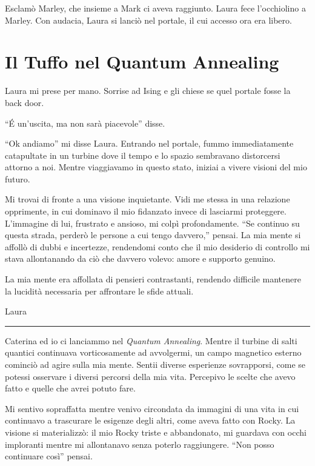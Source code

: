 Esclamò Marley, che insieme a Mark ci aveva raggiunto. Laura fece l'occhiolino a Marley.
Con audacia, Laura si lanciò nel portale, il cui accesso ora era libero.

\section{Il Tuffo nel Quantum Annealing}
Laura mi prese per mano. Sorrise ad Ising e gli chiese se quel portale fosse la back door.

\begin{dialogue}
 \enquote{\'E un'uscita, ma non sarà piacevole} disse.
\end{dialogue}
``Ok andiamo'' mi disse Laura.
Entrando nel portale, fummo immediatamente catapultate  in un turbine  dove il tempo e lo spazio sembravano distorcersi attorno a noi. Mentre viaggiavamo in questo stato, iniziai a vivere visioni del mio futuro.


Mi trovai di fronte a una visione inquietante. Vidi me stessa in una relazione opprimente, in cui dominavo il mio fidanzato invece di lasciarmi proteggere. L'immagine di lui, frustrato e ansioso, mi colpì profondamente. 
\enquote{Se continuo su questa strada, perderò le persone a cui tengo davvero,} pensai. La mia mente si affollò di dubbi e incertezze, rendendomi conto che il mio desiderio di controllo mi stava allontanando da ciò che davvero volevo: amore e supporto genuino.

La mia mente era affollata di pensieri contrastanti, rendendo difficile mantenere la lucidità necessaria per affrontare le sfide attuali.

\newpage
\vspace{1em}
\begin{center}Laura\end{center}
\hrule
\vspace{1em}
Caterina ed io ci lanciammo nel \textit{Quantum Annealing}.
Mentre il turbine di salti quantici continuava  vorticosamente ad avvolgermi, un campo magnetico esterno cominciò ad agire sulla mia mente. Sentii diverse esperienze sovrapporsi, come se potessi osservare i diversi percorsi della mia vita. Percepivo le scelte che avevo fatto e quelle che avrei potuto fare.

Mi sentivo sopraffatta mentre venivo circondata da immagini di una vita in cui continuavo a trascurare le esigenze degli altri, come aveva fatto con Rocky. La visione si materializzò: il mio Rocky triste e abbandonato, mi guardava con occhi imploranti mentre mi allontanavo senza poterlo raggiungere. 
\enquote{Non posso continuare così} pensai.

